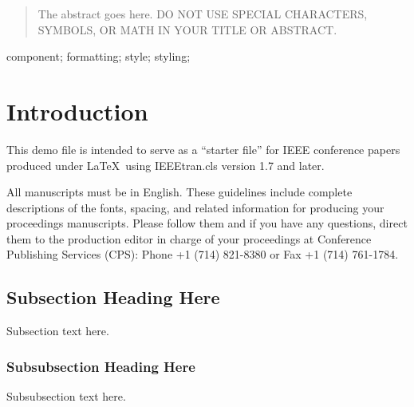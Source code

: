 \documentclass[10pt, conference, compsocconf]{IEEEtran}
\begin{document}
\maketitle


\begin{abstract}
The abstract goes here. DO NOT USE SPECIAL CHARACTERS, SYMBOLS, OR MATH IN YOUR TITLE OR ABSTRACT.

\end{abstract}

\begin{IEEEkeywords}
component; formatting; style; styling;

\end{IEEEkeywords}


%
\IEEEpeerreviewmaketitle



\section{Introduction}
This demo file is intended to serve as a ``starter file''
for IEEE conference papers produced under \LaTeX\ using
IEEEtran.cls version 1.7 and later.

All manuscripts must be in English. These guidelines include complete descriptions of the fonts, spacing, and related information for producing your proceedings manuscripts. Please follow them and if you have any questions, direct them to the production editor in charge of your proceedings at Conference Publishing Services (CPS): Phone +1 (714) 821-8380 or Fax +1 (714) 761-1784.

\subsection{Subsection Heading Here}
Subsection text here.


\subsubsection{Subsubsection Heading Here}
Subsubsection text here.
\end{document}
